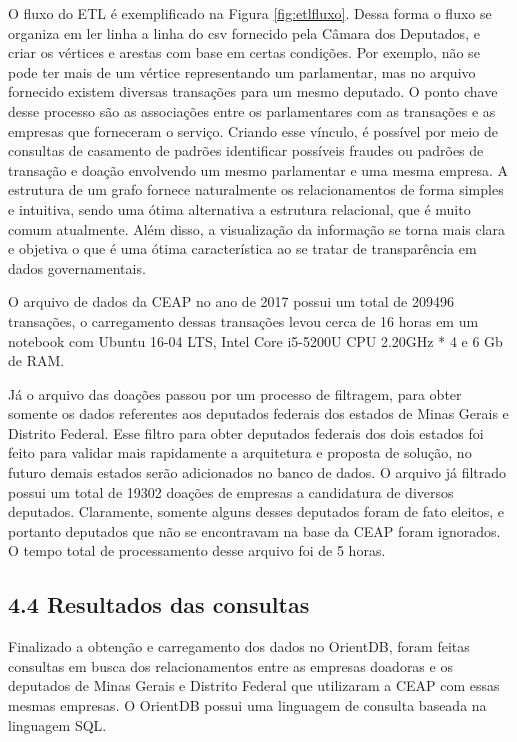 \documentclass[12pt]{article}
\begin{document}
O fluxo do ETL é exemplificado na Figura \ref{fig:etlfluxo}. Dessa forma o fluxo se organiza em ler linha a linha do csv fornecido pela Câmara dos Deputados, e criar os vértices e arestas com base em certas condições. Por exemplo, não se pode ter mais de um vértice representando um parlamentar, mas no arquivo fornecido existem diversas transações para um mesmo deputado. O ponto chave desse processo são as associações entre os parlamentares com as transações e as empresas que forneceram o serviço. Criando esse vínculo, é possível por meio de consultas de casamento de padrões identificar possíveis fraudes ou padrões de transação e doação envolvendo um mesmo parlamentar e uma mesma empresa. A estrutura de um grafo fornece naturalmente os relacionamentos de forma simples e intuitiva, sendo uma ótima alternativa a estrutura relacional, que é muito comum atualmente. Além disso, a visualização da informação se torna mais clara e objetiva o que é uma ótima característica ao se tratar de transparência em dados governamentais.

O arquivo de dados da CEAP no ano de 2017 possui um total de 209496 transações, o carregamento dessas transações levou cerca de 16 horas em um notebook com Ubuntu 16-04 LTS, Intel Core i5-5200U CPU 2.20GHz * 4 e 6 Gb de RAM.

Já o arquivo das doações passou por um processo de filtragem, para obter somente os dados referentes aos deputados federais dos estados de Minas Gerais e Distrito Federal. Esse filtro para obter deputados federais dos dois estados foi feito para validar mais rapidamente a arquitetura e proposta de solução, no futuro demais estados serão adicionados no banco de dados. O arquivo já filtrado possui um total de 19302 doações de empresas a candidatura de diversos deputados. Claramente, somente alguns desses deputados foram de fato eleitos, e portanto deputados que não se encontravam na base da CEAP foram ignorados. O tempo total de processamento desse arquivo foi de 5 horas.

\subsection{4.4 Resultados das consultas} \label{sec:resultados parciais}
	
	Finalizado a obtenção e carregamento dos dados no OrientDB, foram feitas consultas em busca dos relacionamentos entre as empresas doadoras e os deputados de Minas Gerais e Distrito Federal que utilizaram a CEAP com essas mesmas empresas. O OrientDB possui uma linguagem de consulta baseada na linguagem SQL.
	
\end{document}
